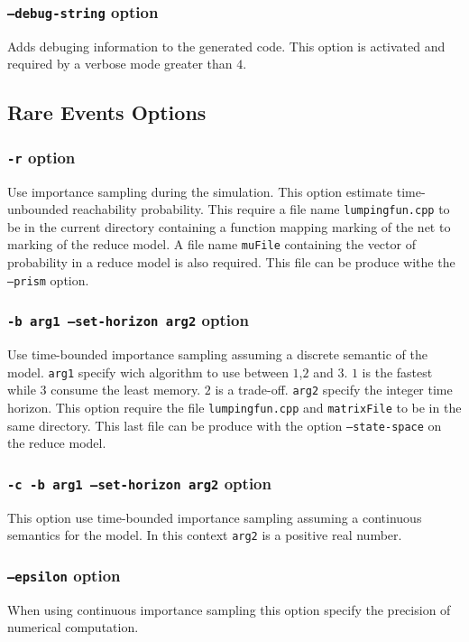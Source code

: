 \documentclass{article}
\begin{document}
\subsubsection{\texttt{--debug-string} option}
Adds debuging information to the generated code. This option is activated
and required by a verbose mode greater than $4$.

\subsection{Rare Events Options}
\subsubsection{\texttt{-r} option}
Use importance sampling during the simulation. This option estimate
time-unbounded reachability probability. This require a file name
\texttt{lumpingfun.cpp} to be in the current directory containing a
function mapping marking of the net to marking of the reduce model. A
file name \texttt{muFile} containing the vector of probability in a
reduce model is also required. This file can be produce withe the
\texttt{--prism} option.

\subsubsection{\texttt{-b arg1 --set-horizon arg2} option}
Use time-bounded importance sampling assuming a discrete semantic of
the model. \texttt{arg1} specify wich algorithm to use between $1$,$2$
and $3$. $1$ is the fastest while $3$ consume the least memory. $2$ is
a trade-off. \texttt{arg2} specify the integer time horizon. This
option require the file \texttt{lumpingfun.cpp} and
\texttt{matrixFile} to be in the same directory. This last file can 
be produce with the option \texttt{--state-space} on the reduce model.

\subsubsection{\texttt{-c -b arg1 --set-horizon arg2} option}
This option use time-bounded importance sampling assuming a continuous
semantics for the model. In this context \texttt{arg2} is a positive real
number.

\subsubsection{\texttt{--epsilon} option}
When using continuous importance sampling this option specify the
precision of numerical computation.
\end{document}

